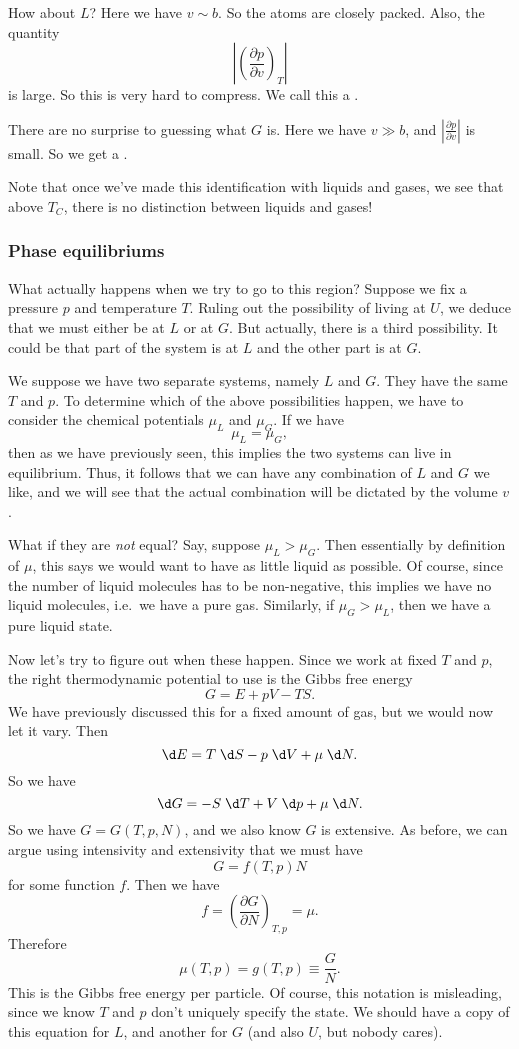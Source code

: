 \documentclass[a4paper]{article}
\begin{document}
How about $L$? Here we have $v \sim b$. So the atoms are closely packed. Also, the quantity
\[
  \left|\left(\frac{\partial p}{\partial v}\right)_T\right|
\]
is large. So this is very hard to compress. We call this a .

There are no surprise to guessing what $G$ is. Here we have $v \gg b$, and $\left|\frac{\partial p}{\partial v}\right|$ is small. So we get a .

Note that once we've made this identification with liquids and gases, we see that above $T_C$, there is no distinction between liquids and gases!

\subsubsection*{Phase equilibriums}
What actually happens when we try to go to this region? Suppose we fix a pressure $p$ and temperature $T$. Ruling out the possibility of living at $U$, we deduce that we must either be at $L$ or at $G$. But actually, there is a third possibility. It could be that part of the system is at $L$ and the other part is at $G$.

We suppose we have two separate systems, namely $L$ and $G$. They have the same $T$ and $p$. To determine which of the above possibilities happen, we have to consider the chemical potentials $\mu_L$ and $\mu_G$. If we have
\[
  \mu_L = \mu_G,
\]
then as we have previously seen, this implies the two systems can live in equilibrium. Thus, it follows that we can have any combination of $L$ and $G$ we like, and we will see that the actual combination will be dictated by the volume $v$.

What if they are \emph{not} equal? Say, suppose $\mu_L > \mu_G$. Then essentially by definition of $\mu$, this says we would want to have as little liquid as possible. Of course, since the number of liquid molecules has to be non-negative, this implies we have no liquid molecules, i.e.\, we have a pure gas. Similarly, if $\mu_G > \mu_L$, then we have a pure liquid state.

Now let's try to figure out when these happen. Since we work at fixed $T$ and $p$, the right thermodynamic potential to use is the Gibbs free energy
\[
  G = E + pV - TS.
\]
We have previously discussed this for a fixed amount of gas, but we would now let it vary. Then
\[
  \d E = T\;\d S - p\;\d V + \mu \;\d N.
\]
So we have
\[
  \d G = - S\;\d T + V \;\d p + \mu \;\d N.
\]
So we have $G = G(T, p, N)$, and we also know $G$ is extensive. As before, we can argue using intensivity and extensivity that we must have
\[
  G = f(T, p) N
\]
for some function $f$. Then we have
\[
  f = \left(\frac{\partial G}{\partial N}\right)_{T, p} = \mu.
\]
Therefore
\[
  \mu(T, p) = g(T, p) \equiv \frac{G}{N}.
\]
This is the Gibbs free energy per particle. Of course, this notation is misleading, since we know $T$ and $p$ don't uniquely specify the state. We should have a copy of this equation for $L$, and another for $G$ (and also $U$, but nobody cares).
\end{document}
